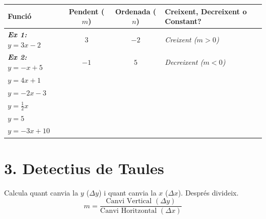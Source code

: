 \documentclass[12pt,a4paper]{article}
\begin{document}
\renewcommand{\arraystretch}{1.5}
\begin{tabularx}{\textwidth}{|X|c|c|X|}
    \hline
    \textbf{Funció} & \textbf{Pendent ($m$)} & \textbf{Ordenada ($n$)} & \textbf{Creixent, Decreixent o Constant?} \\ \hline
    \textbf{\textit{Ex 1: }} $y = 3x - 2$ & $3$ & $-2$ & \textit{Creixent ($m > 0$)} \\ \hline
    \textbf{\textit{Ex 2: }} $y = -x + 5$ & $-1$ & $5$ & \textit{Decreixent ($m < 0$)} \\ \hline
    $y = 4x + 1$ & & & \\ \hline
    $y = -2x - 3$ & & & \\ \hline
    $y = \frac{1}{2}x$ & & & \\ \hline
    $y = 5$ & & & \\ \hline
    $y = -3x + 10$ & & & \\ \hline
\end{tabularx}


\section*{3. Detectius de Taules}
Calcula quant canvia la $y$ ($\Delta y$) i quant canvia la $x$ ($\Delta x$). Després divideix.
\[ m = \frac{\text{Canvi Vertical } (\Delta y)}{\text{Canvi Horitzontal } (\Delta x)} \]

\vspace{0.5cm}
\end{document}

